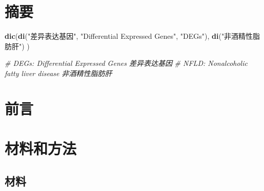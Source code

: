 \documentclass[
]{article}
\author{}
\date{\vspace{-2.5em}}
\newenvironment{Shaded}{\begin{snugshade}}{\end{snugshade}}
\newcommand{\CommentTok}[1]{\textcolor[rgb]{0.56,0.35,0.01}{\textit{#1}}}
\newcommand{\KeywordTok}[1]{\textcolor[rgb]{0.13,0.29,0.53}{\textbf{#1}}}
\newcommand{\NormalTok}[1]{#1}
\newcommand{\StringTok}[1]{\textcolor[rgb]{0.31,0.60,0.02}{#1}}
\begin{document}

\begin{center}\vspace{1.5cm}\end{center}\tableofcontents

\begin{center}\vspace{1.5cm}\end{center}\listoffigures

\begin{center}\vspace{1.5cm}\end{center}\listoftables

\newpage


\hypertarget{abstract}{%
\section{摘要}\label{abstract}}

\begin{Shaded}
\begin{Highlighting}[]
\KeywordTok{dic}\NormalTok{(}\KeywordTok{di}\NormalTok{(}\StringTok{"差异表达基因"}\NormalTok{, }\StringTok{"Differential Expressed Genes"}\NormalTok{, }\StringTok{"DEGs"}\NormalTok{),}
  \KeywordTok{di}\NormalTok{(}\StringTok{"非酒精性脂肪肝"}\NormalTok{)}
\NormalTok{)}

\CommentTok{\# DEGs: Differential Expressed Genes 差异表达基因}
\CommentTok{\# NFLD: Nonalcoholic fatty liver disease 非酒精性脂肪肝}
\end{Highlighting}
\end{Shaded}

\hypertarget{introduction}{%
\section{前言}\label{introduction}}

\hypertarget{methods}{%
\section{材料和方法}\label{methods}}

\hypertarget{ux6750ux6599}{%
\subsection{材料}\label{ux6750ux6599}}
\end{document}
